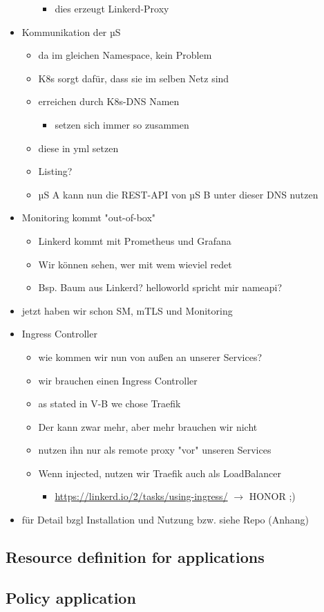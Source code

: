 \begin{itemize}
\begin{itemize}
\begin{itemize}
	\item dies erzeugt Linkerd-Proxy
\end{itemize}
\end{itemize}
	\item Kommunikation der µS
\begin{itemize}
	\item da im gleichen Namespace, kein Problem
	\item K8s sorgt dafür, dass sie im selben Netz sind
	\item erreichen durch K8s-DNS Namen
\begin{itemize}
	\item setzen sich immer so zusammen
\end{itemize}
	\item diese in yml setzen
	\item Listing?
	\item µS A kann nun die REST-API von µS B unter dieser DNS nutzen
\end{itemize}
	\item Monitoring kommt "out-of-box"
\begin{itemize}
	\item Linkerd kommt mit Prometheus und Grafana
	\item Wir können sehen, wer mit wem wieviel redet
	\item Bsp. Baum aus Linkerd? helloworld spricht mir nameapi?
\end{itemize}
	\item jetzt haben wir schon SM, mTLS und Monitoring 
	\item Ingress Controller
\begin{itemize}
	\item wie kommen wir nun von außen an unserer Services?
	\item wir brauchen einen Ingress Controller
	\item as stated in V-B we chose Traefik
	\item Der kann zwar mehr, aber mehr brauchen wir nicht 
	\item nutzen ihn nur als remote proxy "vor" unseren Services
	\item Wenn injected, nutzen wir Traefik auch als LoadBalancer
\begin{itemize}
	\item \url{https://linkerd.io/2/tasks/using-ingress/} $\rightarrow$ HONOR ;)
\end{itemize}
\end{itemize}
	\item für Detail bzgl Installation und Nutzung bzw. siehe Repo (Anhang)
\end{itemize}



\subsection{Resource definition for applications}

\subsection{Policy application}